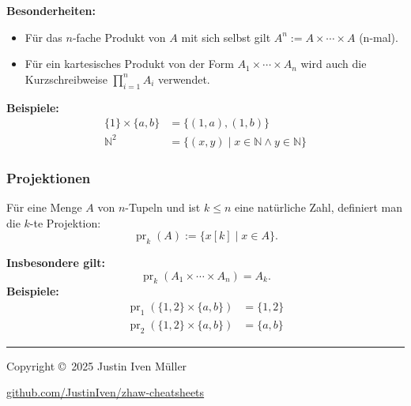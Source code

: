 \documentclass[10pt,landscape]{article}
\begin{document}
\begin{multicols*}{4}
\textbf{Besonderheiten:}
\begin{itemize}
  \item Für das $n$-fache Produkt von \(A\) mit sich selbst gilt \(A^n:=A\times\cdots\times A\) (n-mal).
  \item Für ein kartesisches Produkt von der Form \(A_1\times\cdots\times A_n\) wird auch die Kurzschreibweise \(\prod_{i=1}^n A_i\) verwendet.
\end{itemize}

\textbf{Beispiele:}
\begin{align*}
  \{1\} \times \{a, b\} &= \{(1, a), (1, b)\} \\
  \mathbb{N}^2 &= \{(x, y) \mid x \in \mathbb{N} \land y \in \mathbb{N}\}
\end{align*}

\subsubsection{Projektionen}
Für eine Menge \(A\) von \(n\)-Tupeln und ist \(k \le n\) eine natürliche Zahl, definiert man die \(k\)-te Projektion:
\[
  \operatorname{pr}_k(A) := \{ x[k] \mid x \in A \}.
\]

\textbf{Insbesondere gilt:}
\[
  \operatorname{pr}_k(A_1 \times \cdots \times A_n) = A_k.
\]
\textbf{Beispiele:}
\begin{align*}
  \operatorname{pr}_1(\{1,2\} \times \{a,b\}) &= \{1, 2\} \\
  \operatorname{pr}_2(\{1,2\} \times \{a,b\}) &= \{a, b\}
\end{align*}

% 
% 

\vfill

\rule{0.3\linewidth}{0.25pt}
\scriptsize

Copyright \copyright\ 2025 Justin Iven Müller

\href{https://github.com/JustinIven/zhaw-cheatsheets}{github.com/JustinIven/zhaw-cheatsheets}


\end{multicols*}
\end{document}
